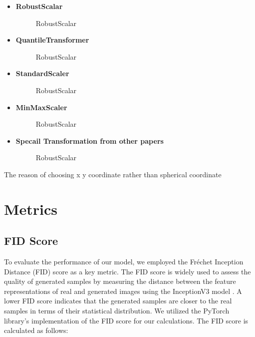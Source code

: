 \begin{itemize}
    \item \textbf{RobustScalar}
    \begin{figure}[ht]
        \centering
        \caption{RobustScalar}
    \end{figure}
    \item \textbf{QuantileTransformer}
    \begin{figure}[ht]
        \centering
        \caption{RobustScalar}
    \end{figure}
    \item \textbf{StandardScaler}
    \begin{figure}[ht]
        \centering
        \caption{RobustScalar}
    \end{figure}
    \item \textbf{MinMaxScaler}
    \begin{figure}[ht]
        \centering
        \caption{RobustScalar}
    \end{figure}
    \item \textbf{Specail Transformation from other papers}
    \begin{figure}[ht]
        \centering
        \caption{RobustScalar}
    \end{figure}
\end{itemize}


The reason of choosing x y coordinate rather than spherical coordinate
\section{Metrics}
\subsection{FID Score}
To evaluate the performance of our model, we employed the Fréchet Inception Distance (FID) score as a key metric. The FID score is widely used to assess the quality of generated samples by measuring the distance between the feature representations of real and generated images using the InceptionV3 model \cite{inceptionv3}. A lower FID score indicates that the generated samples are closer to the real samples in terms of their statistical distribution. We utilized the PyTorch library's implementation of the FID score \cite{pytorch} for our calculations. The FID score is calculated as follows:

